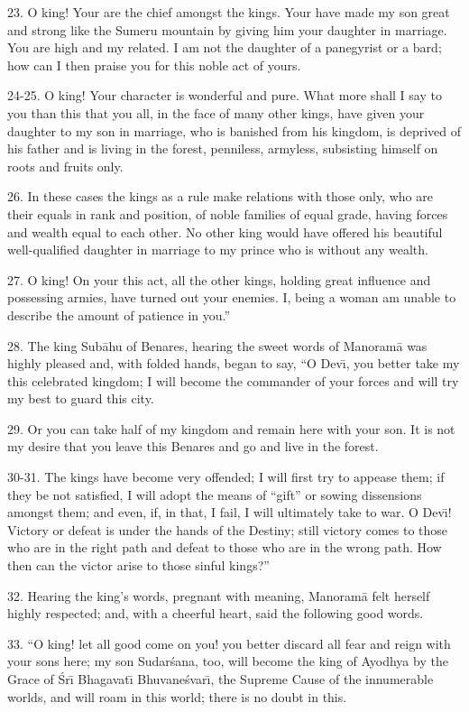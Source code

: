 23. O king! Your are the chief amongst the kings. Your have made my son great and strong like the Sumeru mountain by giving him your daughter in marriage. You are high and my related. I am not the daughter of a panegyrist or a bard; how can I then praise you for this noble act of yours.

24-25. O king! Your character is wonderful and pure. What more shall I say to you than this that you all, in the face of many other kings, have given your daughter to my son in marriage, who is banished from his kingdom, is deprived of his father and is living in the forest, penniless, armyless, subsisting himself on roots and fruits only.

26. In these cases the kings as a rule make relations with those only, who are their equals in rank and position, of noble families of equal grade, having forces and wealth equal to each other. No other king would have offered his beautiful well-qualified daughter in marriage to my prince who is without any wealth.

27. O king! On your this act, all the other kings, holding great influence and possessing armies, have turned out your enemies. I, being a woman am unable to describe the amount of patience in you.''

28. The king Sub\=ahu of Benares, hearing the sweet words of Manoram\=a was highly pleased and, with folded hands, began to say, ``O Dev\={\i}, you better take my this celebrated kingdom; I will become the commander of your forces and will try my best to guard this city.

29. Or you can take half of my kingdom and remain here with your son. It is not my desire that you leave this Benares and go and live in the forest.

30-31. The kings have become very offended; I will first try to appease them; if they be not satisfied, I will adopt the means of ``gift'' or sowing dissensions amongst them; and even, if, in that, I fail, I will ultimately take to war. O Dev\={\i}! Victory or defeat is under the hands of the Destiny; still victory comes to those who are in the right path and defeat to those who are in the wrong path. How then can the victor arise to those sinful kings?''

32. Hearing the king's words, pregnant with meaning, Manoram\=a felt herself highly respected; and, with a cheerful heart, said the following good words.

33. ``O king! let all good come on you! you better discard all fear and reign with your sons here; my son Sudar\'sana, too, will become the king of Ayodhya by the Grace of \'Sr\={\i} Bhagavat\={\i} Bhuvane\'svar\={\i}, the Supreme Cause of the innumerable worlds, and will roam in this world; there is no doubt in this.

